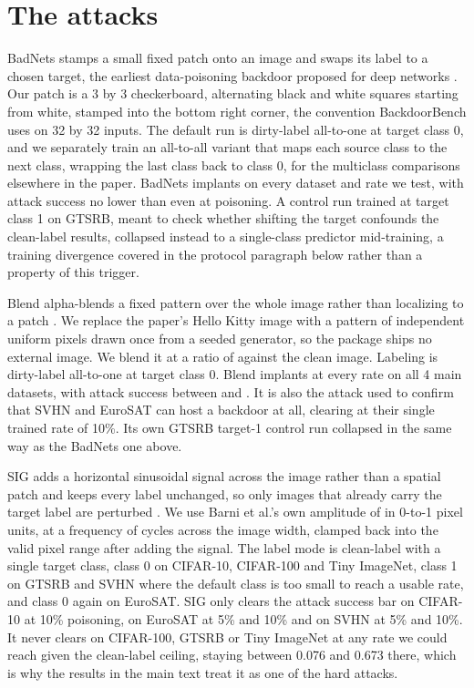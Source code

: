 \section{The attacks}
\label{app:attacks}

BadNets stamps a small fixed patch onto an image and swaps its label to a chosen target, the earliest data-poisoning backdoor proposed for deep networks \cite{gu2017badnets}. Our patch is a 3 by 3 checkerboard, alternating black and white squares starting from white, stamped into the bottom right corner, the convention BackdoorBench uses on 32 by 32 inputs. The default run is dirty-label all-to-one at target class 0, and we separately train an all-to-all variant that maps each source class to the next class, wrapping the last class back to class 0, for the multiclass comparisons elsewhere in the paper. BadNets implants on every dataset and rate we test, with attack success no lower than \AttackBadnetATwooAsrMin{} even at \PanelRateLow{} poisoning. A control run trained at target class 1 on GTSRB, meant to check whether shifting the target confounds the clean-label results, collapsed instead to a single-class predictor mid-training, a training divergence covered in the protocol paragraph below rather than a property of this trigger.

Blend alpha-blends a fixed pattern over the whole image rather than localizing to a patch \cite{chen2017targeted}. We replace the paper's Hello Kitty image with a pattern of independent uniform pixels drawn once from a seeded generator, so the package ships no external image. We blend it at a ratio of \AttackBlendAlpha{} against the clean image. Labeling is dirty-label all-to-one at target class 0. Blend implants at every rate on all 4 main datasets, with attack success between \AttackBlendAsrMin{} and \AttackBlendAsrMax{}. It is also the attack used to confirm that SVHN and EuroSAT can host a backdoor at all, clearing at their single trained rate of 10\%. Its own GTSRB target-1 control run collapsed in the same way as the BadNets one above.

SIG adds a horizontal sinusoidal signal across the image rather than a spatial patch and keeps every label unchanged, so only images that already carry the target label are perturbed \cite{barni2019sig}. We use Barni et al.'s own amplitude of \AttackSigAmplitude{} in 0-to-1 pixel units, at a frequency of \AttackSigFrequency{} cycles across the image width, clamped back into the valid pixel range after adding the signal. The label mode is clean-label with a single target class, class 0 on CIFAR-10, CIFAR-100 and Tiny ImageNet, class 1 on GTSRB and SVHN where the default class is too small to reach a usable rate, and class 0 again on EuroSAT. SIG only clears the attack success bar on CIFAR-10 at 10\% poisoning, on EuroSAT at 5\% and 10\% and on SVHN at 5\% and 10\%. It never clears on CIFAR-100, GTSRB or Tiny ImageNet at any rate we could reach given the clean-label ceiling, staying between 0.076 and 0.673 there, which is why the results in the main text treat it as one of the hard attacks.

